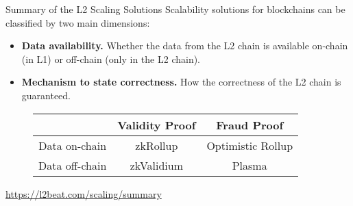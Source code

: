 \begin{frame}[t]{Summary of the L2 Scaling Solutions}
Scalability solutions for blockchains can be classified by two main dimensions:
  \begin{itemize}
  \item \textbf{Data availability.} Whether the data from the L2 chain is available on-chain (in L1) or off-chain (only in the L2 chain).
  \item \textbf{Mechanism to state correctness.} How the correctness of the L2 chain is guaranteed.
  \end{itemize}

\vspace{0.35cm}
\begin{figure}
\begin{tabular}{|c|c|c|}
\hline
\cellcolor{darkgray} & \cellcolor{darkgray} \color{white} Validity Proof  & \cellcolor{darkgray} \color{white} Fraud Proof \\ \hline
\cellcolor{lightgray} Data on-chain   & zkRollup       & Optimistic Rollup \\ \hline
\cellcolor{lightgray} Data off-chain  & zkValidium     & Plasma \\ \hline
\end{tabular}
\end{figure}

\centering
\vspace{0.2cm}
\url{https://l2beat.com/scaling/summary}
\end{frame}




